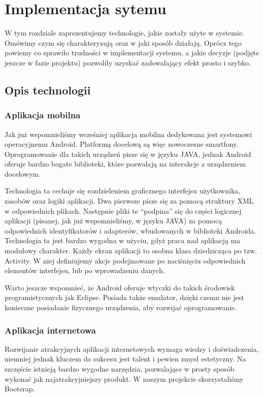 \documentclass[12pt,titlepage]{article}
\begin{document}
\newpage
\section{Implementacja sytemu} 
W tym rozdziale zaprezentujemy technologie, jakie zostały użyte w systemie. Omówimy czym się charakteryzują oraz w jaki sposób działają. Oprócz tego powiemy co sprawiło trudności 
w implementacji systemu, a jakie decyzje (podjęte jeszcze w fazie projektu) pozwoliły uzyskać zadowalający efekt prosto i szybko.
\subsection{Opis technologii}
\subsubsection{Aplikacja mobilna}
Jak już wspomnieliśmy wcześniej aplikacja mobilna dedykowana jest systemowi operacyjnemu Android. Platformą docelową są więc nowoczesne smartfony.
Oprogramowanie dla takich urządzeń pisze się w języku JAVA, jednak Android oferuje bardzo bogate biblioteki, które pozwalają na interakcje z urządzeniem docelowym.

Technologia ta cechuje się rozdzieleniem graficznego interfejsu użytkownika, zasobów oraz logiki aplikacji. Dwa pierwsze pisze się za pomocą struktury XML w odpowiednich plikach.
Następnie pliki te ``podpina'' się do części logicznej aplikacji (pisanej, jak już wspomnieliśmy, w języku JAVA) za pomocą odpowiednich identyfikatorów i adapterów, wbudowanych w biblioteki Androida.
Technologia ta jest bardzo wygodna w użyciu, gdyż praca nad aplikacją ma modułowy charakter. Każdy ekran aplikacji to osobna klasa dziedzicząca po tzw. Activity. W niej definiujemy akcje podejmowane
po naciśnięciu odpowiednich elementów interfejsu, lub po wprowadzeniu danych.

Warto jeszcze wspomnieć, że Android oferuje wtyczki do takich środowisk programistycznych jak Eclipse. Posiada także emulator, dzięki czemu nie jest konieczne posiadanie fizycznego urządzenia, aby
rozwijać oprogramowanie.
\subsubsection{Aplikacja internetowa}
Rozwijanie atrakcyjnych aplikacji internetowych wymaga wiedzy i doświadczenia, niemniej jednak kluczem do sukcesu jest talent i pewien zmysł estetyczny. Na szczęście istnieją bardzo wygodne narzędzia,
pozwalające w prosty sposób wykonać jak najatrakcyjniejszy produkt. W naszym projekcie skorzystaliśmy Bootsrap.
\end{document}
